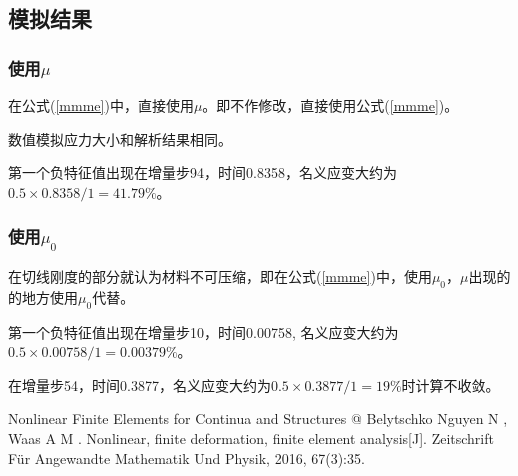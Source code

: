 \documentclass{article}
\begin{document}
\subsection{模拟结果}

\subsubsection{使用$\mu$}
在公式(\ref{mmme})中，直接使用$\mu$。即不作修改，直接使用公式(\ref{mmme})。

数值模拟应力大小和解析结果相同。

第一个负特征值出现在增量步94，时间0.8358，名义应变大约为$0.5 \times 0.8358/1=41.79\%$。

\subsubsection{使用$\mu_0$}
在切线刚度的部分就认为材料不可压缩，即在公式(\ref{mmme})中，使用$\mu_0$，$\mu$出现的的地方使用$\mu_0$代替。

第一个负特征值出现在增量步10，时间0.00758, 名义应变大约为$0.5 \times 0.00758/1=0.00379\%$。

在增量步54，时间0.3877，名义应变大约为$0.5 \times 0.3877/1=19\%$时计算不收敛。

\begin{thebibliography}{1}
      Nonlinear Finite Elements for Continua and Structures @ Belytschko
     Nguyen N , Waas A M . Nonlinear, finite deformation, finite element analysis[J]. Zeitschrift Für Angewandte Mathematik Und Physik, 2016, 67(3):35.
\end{thebibliography}
\end{document}
